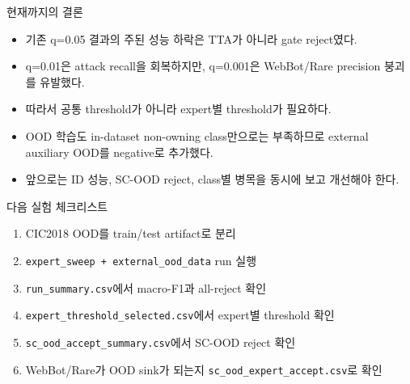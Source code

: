 \documentclass[aspectratio=169]{beamer}
\begin{document}
\begin{frame}{현재까지의 결론}
\begin{itemize}
  \item 기존 q=0.05 결과의 주된 성능 하락은 TTA가 아니라 gate reject였다.
  \item q=0.01은 attack recall을 회복하지만, q=0.001은 WebBot/Rare precision 붕괴를 유발했다.
  \item 따라서 공통 threshold가 아니라 expert별 threshold가 필요하다.
  \item OOD 학습도 in-dataset non-owning class만으로는 부족하므로 external auxiliary OOD를 negative로 추가했다.
  \item 앞으로는 ID 성능, SC-OOD reject, class별 병목을 동시에 보고 개선해야 한다.
\end{itemize}
\end{frame}

\begin{frame}{다음 실험 체크리스트}
\begin{enumerate}
  \item CIC2018 OOD를 train/test artifact로 분리
  \item \texttt{expert\_sweep + external\_ood\_data} run 실행
  \item \texttt{run\_summary.csv}에서 macro-F1과 all-reject 확인
  \item \texttt{expert\_threshold\_selected.csv}에서 expert별 threshold 확인
  \item \texttt{sc\_ood\_accept\_summary.csv}에서 SC-OOD reject 확인
  \item WebBot/Rare가 OOD sink가 되는지 \texttt{sc\_ood\_expert\_accept.csv}로 확인
\end{enumerate}
\end{frame}
\end{document}
